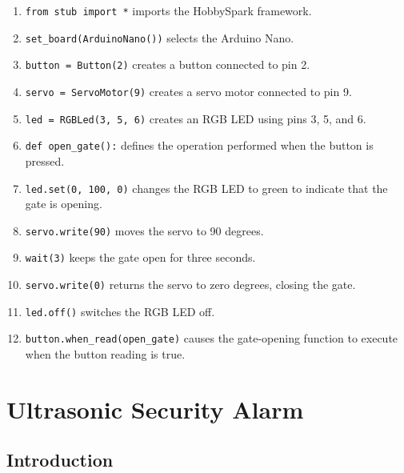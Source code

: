 \begin{enumerate}
    \item \texttt{from stub import *} imports the HobbySpark framework.

    \item \texttt{set\_board(ArduinoNano())} selects the Arduino Nano.

    \item \texttt{button = Button(2)} creates a button connected to pin 2.

    \item \texttt{servo = ServoMotor(9)} creates a servo motor connected to
    pin 9.

    \item \texttt{led = RGBLed(3, 5, 6)} creates an RGB LED using pins 3,
    5, and 6.

    \item \texttt{def open\_gate():} defines the operation performed when the
    button is pressed.

    \item \texttt{led.set(0, 100, 0)} changes the RGB LED to green to indicate
    that the gate is opening.

    \item \texttt{servo.write(90)} moves the servo to 90 degrees.

    \item \texttt{wait(3)} keeps the gate open for three seconds.

    \item \texttt{servo.write(0)} returns the servo to zero degrees,
    closing the gate.

    \item \texttt{led.off()} switches the RGB LED off.

    \item \texttt{button.when\_read(open\_gate)} causes the gate-opening
    function to execute when the button reading is true.
\end{enumerate}


\newpage

\section{Ultrasonic Security Alarm}

\subsection{Introduction}

